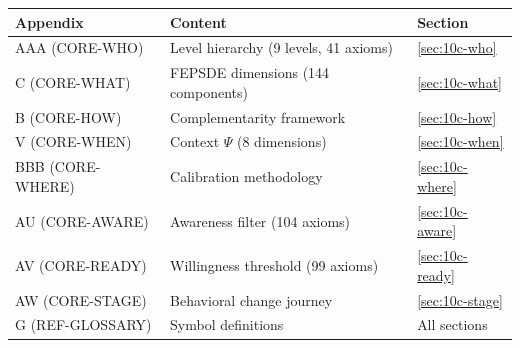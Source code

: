 \begin{tcolorbox}[
    colback=yellow!10!white,
    colframe=orange!75!black,
    title={\textbf{Appendix References for This Chapter}},
    fonttitle=\bfseries
]
\small
\begin{tabular}{@{}p{3.2cm}p{5.2cm}p{3.8cm}@{}}
\textbf{Appendix} & \textbf{Content} & \textbf{Section} \\
\midrule
AAA (CORE-WHO) & Level hierarchy (9 levels, 41 axioms) & \ref{sec:10c-who} \\
C (CORE-WHAT) & FEPSDE dimensions (144 components) & \ref{sec:10c-what} \\
B (CORE-HOW) & Complementarity framework & \ref{sec:10c-how} \\
V (CORE-WHEN) & Context $\Psi$ (8 dimensions) & \ref{sec:10c-when} \\
BBB (CORE-WHERE) & Calibration methodology & \ref{sec:10c-where} \\
AU (CORE-AWARE) & Awareness filter (104 axioms) & \ref{sec:10c-aware} \\
AV (CORE-READY) & Willingness threshold (99 axioms) & \ref{sec:10c-ready} \\
AW (CORE-STAGE) & Behavioral change journey & \ref{sec:10c-stage} \\
G (REF-GLOSSARY) & Symbol definitions & All sections
\end{tabular}
\end{tcolorbox}

